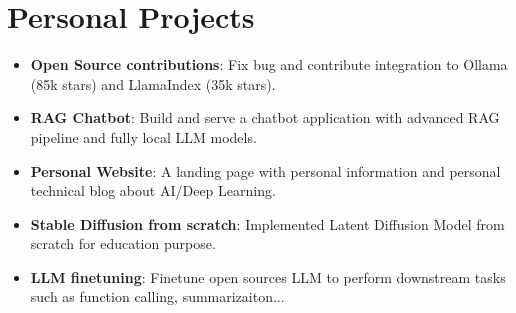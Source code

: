 \documentclass[letterpaper,11pt]{article}
\newcommand{\resumeitem}[1]{
  \item \small{
    \hspace{1pt} #1 \vspace{-1pt}
  }
}
\newcommand{\resumeItemListStart}{\begin{itemize}}
\newcommand{\resumeItemListEnd}{\end{itemize}\vspace{-5pt}}
\begin{document}
\section{Personal Projects}
\resumeItemListStart[leftmargin=2pt,label={}]
  \resumeitem{\textbf{Open Source contributions}: {Fix bug and contribute integration to Ollama (85k stars) and LlamaIndex (35k stars).}} \\[-\baselineskip]
  \resumeitem{\textbf{RAG Chatbot}: {Build and serve a chatbot application with advanced RAG pipeline and fully local LLM models.}} \\[-\baselineskip]
  \resumeitem{\textbf{Personal Website}: {A landing page with personal information and personal technical blog about AI/Deep Learning.}} \\[-\baselineskip]
  \resumeitem{\textbf{Stable Diffusion from scratch}: {Implemented Latent Diffusion Model from scratch for education purpose.}} \\[-\baselineskip]
  \resumeitem{\textbf{LLM finetuning}: {Finetune open sources LLM to perform downstream tasks such as function calling, summarizaiton...}} \\[-\baselineskip]
\resumeItemListEnd
\end{document}
